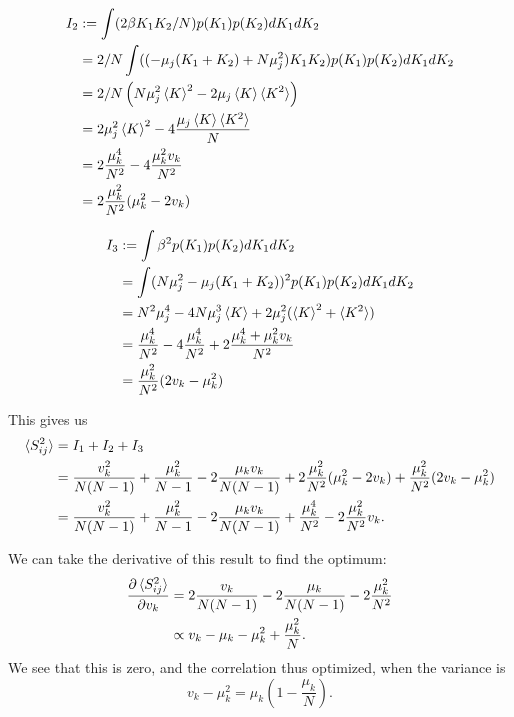\documentclass{article}
\begin{document}
\begin{align}
    I_2 &:= \int (2\beta K_1 K_2/N) p(K_1) p(K_2) dK_1 dK_2\\
    &= 2/N \int ((-\mu_j (K_1+K_2) + N \mu_j^2) K_1 K_2) p(K_1) p(K_2) dK_1 dK_2\\
    &=2/N \left ( N \mu_j^2 \braket{K}^2 - 2 \mu_j \braket{K}\braket{K^2} \right )\\
    &= 2 \mu_j^2 \braket{K}^2 - 4 \frac{\mu_j \braket{K}\braket{K^2}}{N}\\
    &= 2 \frac{\mu_k^4}{N^2} - 4 \frac{\mu_k^2 v_k}{N^2}\\
    &= 2 \frac{\mu_k^2}{N^2}(\mu_k^2 - 2 v_k) 
\end{align}

\begin{align}
    I_3 &:= \int \beta^2 p(K_1) p(K_2) dK_1 dK_2\\
    &= \int (N \mu_j^2 - \mu_j (K_1+K_2))^2 p(K_1) p(K_2) dK_1 dK_2\\
    &= N^2 \mu_j^4 - 4 N \mu_j^3 \braket{K} + 2 \mu_j^2 (\braket{K}^2 + \braket{K^2})\\
    &= \frac{\mu_k^4}{N^2} - 4 \frac{\mu_k^4}{N^2} + 2 \frac{\mu_k^4 + \mu_k^2 v_k}{N^2}\\
    &= \frac{\mu_k^2}{N^2}(2 v_k - \mu_k^2)
\end{align}

This gives us
\begin{align}
    \braket{S_{ij}^2} &= I_1 + I_2 + I_3\\
    &= \frac{v_k^2}{N (N-1)} + \frac{\mu_k^2}{N-1} - 2 \frac{\mu_k v_k}{N (N-1)} + 2 \frac{\mu_k^2}{N^2}(\mu_k^2 - 2 v_k) + \frac{\mu_k^2}{N^2}(2 v_k - \mu_k^2)\\
    &= \frac{v_k^2}{N (N-1)} + \frac{\mu_k^2}{N-1} - 2 \frac{\mu_k v_k}{N (N-1)} + \frac{\mu_k^4}{N^2} - 2 \frac{\mu_k^2}{N^2} v_k.
\end{align}

We can take the derivative of this result to find the optimum:
\begin{align}
    \frac{\partial \braket{S_{ij}^2}}{\partial v_k} &= 
    2 \frac{v_k}{N (N-1)} - 2 \frac{\mu_k}{N (N-1)} - 2 \frac{\mu_k^2}{N^2}\\
    &\propto v_k - \mu_k - \mu_k^2 + \frac{\mu_k^2}{N}.
\end{align}
We see that this is zero, and the correlation thus optimized, when the variance is
\begin{equation}
    v_k - \mu_k^2 = \mu_k ( 1 - \frac{\mu_k}{N}).
\end{equation}
\end{document}
